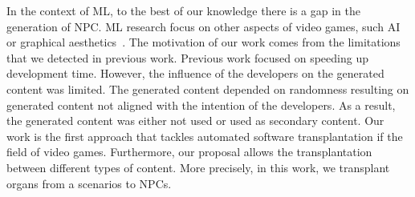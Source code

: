 In the context of ML, to the best of our knowledge there is a gap in the generation of NPC. ML research focus on other aspects of video games, such AI~\cite{brocchini2022monster} or graphical aesthetics~\cite{li2020automatic}.
The motivation of our work comes from the limitations that we detected in previous work. Previous work focused on speeding up development time. However, the influence of the developers on the generated content was limited. The generated content depended on randomness resulting on generated content not aligned with the intention of the developers. As a result, the generated content was either not used or used as secondary content. 
Our work is the first approach that tackles automated software transplantation if the field of video games. Furthermore, our proposal allows the transplantation between different types of content. More precisely, in this work, we transplant organs from a scenarios to NPCs.





